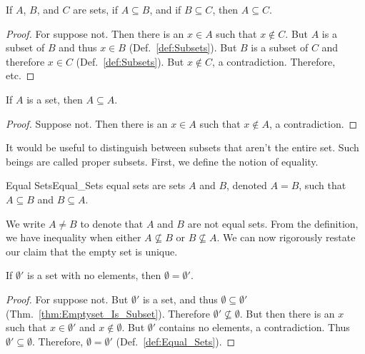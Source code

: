 \documentclass[crop=false,class=book,oneside]{standalone}
\begin{document}
            \begin{theorem}
                \label{thm:Subset_is_Transitive}%
                If $A$, $B$, and $C$ are sets, if
                $A\subseteq{B}$, and if $B\subseteq{C}$, then
                $A\subseteq{C}$.
            \end{theorem}
            \begin{proof}
                For suppose not. Then there is an $x\in{A}$ such
                that $x\notin{C}$. But $A$ is a subset of $B$
                and thus $x\in{B}$ (Def.~\ref{def:Subsets}). But
                $B$ is a subset of $C$ and therefore $x\in{C}$
                (Def.~\ref{def:Subsets}). But $x\notin{C}$, a
                contradiction. Therefore, etc.
            \end{proof}
            \begin{theorem}
                \label{thm:Set_Is_Subset_Of_Self}%
                If $A$ is a set, then $A\subseteq{A}$.
            \end{theorem}
            \begin{proof}
                Suppose not. Then there is an $x\in{A}$
                such that $x\notin{A}$, a contradiction.
            \end{proof}
            It would be useful to distinguish between subsets
            that aren't the entire set. Such beings are called
            proper subsets. First, we define the notion of
            equality.
            \begin{ldefinition}{Equal Sets}{Equal_Sets}
                \Glspl{equal set} are sets $A$ and $B$, denoted
                $A=B$, such that $A\subseteq{B}$ and
                $B\subseteq{A}$.
            \end{ldefinition}
            We write $A\ne{B}$ to denote that $A$ and $B$ are
            not equal sets. From the definition, we have
            inequality when either $A\nsubseteq{B}$ or
            $B\nsubseteq{A}$. 
            We can now rigorously restate our claim that the
            empty set is unique.
            \begin{theorem}
                If $\emptyset'$ is a set with no elements,
                then $\emptyset=\emptyset'$.
            \end{theorem}
            \begin{proof}
                For suppose not. But $\emptyset'$ is a set, and
                thus $\emptyset\subseteq\emptyset'$
                (Thm.~\ref{thm:Emptyset_Is_Subset}). Therefore
                $\emptyset'\nsubseteq\emptyset$. But then there
                is an $x$ such that $x\in\emptyset'$ and
                $x\notin\emptyset$. But $\emptyset'$ contains
                no elements, a contradiction. Thus
                $\emptyset'\subseteq\emptyset$. Therefore,
                $\emptyset=\emptyset'$
                (Def.~\ref{def:Equal_Sets}).
            \end{proof}
\end{document}
